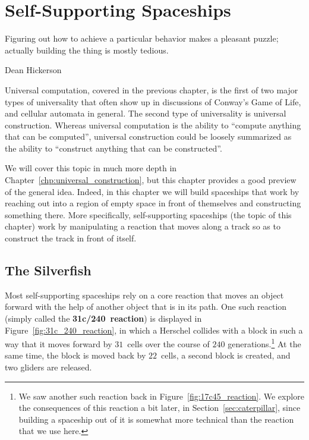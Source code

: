
\renewcommand{\chapterfolder}{self_support_spaceships/}
\chapter{Self-Supporting Spaceships}\label{chp:self_support_spaceships}


\vspace*{-0.4in}
\epigraph{Figuring out how to achieve a particular behavior makes a pleasant puzzle; actually building the thing is mostly tedious.}{Dean Hickerson}
\vspace*{0.4in}


\noindent Universal computation, covered in the previous chapter, is the first of two major types of universality that often show up in discussions of Conway's Game of Life, and cellular automata in general. The second type of universality is universal construction. Whereas universal computation is the ability to ``compute anything that can be computed'', universal construction could be loosely summarized as the ability to ``construct anything that can be constructed''.

We will cover this topic in much more depth in Chapter~\ref{chp:universal_construction}, but this chapter provides a good preview of the general idea. Indeed, in this chapter we will build spaceships that work by reaching out into a region of empty space in front of themselves and constructing something there. More specifically, self-supporting spaceships (the topic of this chapter) work by manipulating a reaction that moves along a track so as to construct the track in front of itself.


\section{The Silverfish}\label{sec:silverfish}

Most self-supporting spaceships rely on a core reaction that moves an object forward with the help of another object that is in its path. One such reaction (simply called the \textbf{31c/240~reaction}) is displayed in Figure~\ref{fig:31c_240_reaction}, in which a Herschel collides with a block in such a way that it moves forward by $31$~cells over the course of $240$ generations.\footnote{We saw another such reaction back in Figure~\ref{fig:17c45_reaction}. We explore the consequences of this reaction a bit later, in Section~\ref{sec:caterpillar}, since building a spaceship out of it is somewhat more technical than the reaction that we use here.} At the same time, the block is moved back by $22$~cells, a second block is created, and two gliders are released.

